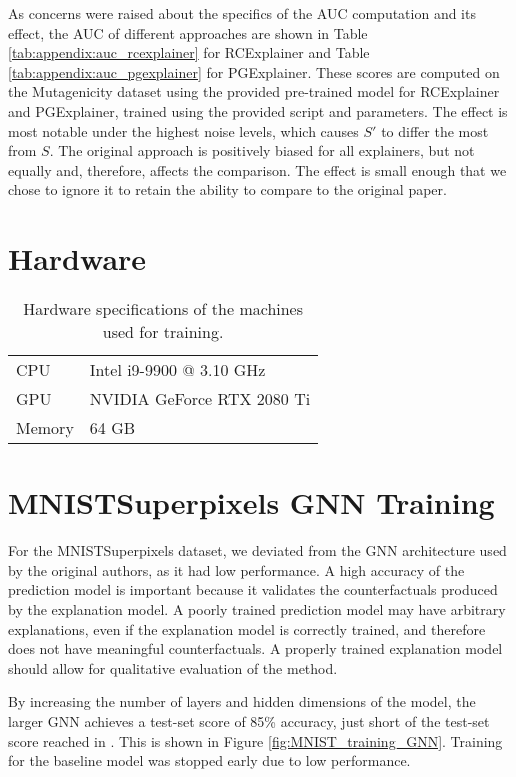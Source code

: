 As concerns were raised about the specifics of the AUC computation and its effect, the AUC of different approaches are shown in Table \ref{tab:appendix:auc_rcexplainer} for RCExplainer and Table \ref{tab:appendix:auc_pgexplainer} for PGExplainer. These scores are computed on the Mutagenicity dataset using the provided pre-trained model for RCExplainer and PGExplainer, trained using the provided script and parameters. The effect is most notable under the highest noise levels, which causes $S'$ to differ the most from $S$. The original approach is positively biased for all explainers, but not equally and, therefore, affects the comparison. The effect is small enough that we chose to ignore it to retain the ability to compare to the original paper. 


\section{Hardware}
\label{appendix:hardware}
\begin{table}[h]
\centering
\caption{Hardware specifications of the machines used for training.}
\label{tab:appendix:hwspec}
\begin{tabular}{ll}
\toprule 
CPU    & Intel i9-9900 @ 3.10 GHz      \\
GPU    & NVIDIA GeForce RTX 2080 Ti   \\
Memory & 64 GB                        \\
\bottomrule
\end{tabular}
\end{table}

\section{MNISTSuperpixels GNN Training}
\label{appendix:GNN_training}
For the MNISTSuperpixels dataset, we deviated from the GNN architecture used by the original authors, as it had low performance. A high accuracy of the prediction model is important because it validates the counterfactuals produced by the explanation model. A poorly trained prediction model may have arbitrary explanations, even if the explanation model is correctly trained, and therefore does not have meaningful counterfactuals. A properly trained explanation model should allow for qualitative evaluation of the method.

By increasing the number of layers and hidden dimensions of the model, the larger GNN achieves a test-set score of 85\% accuracy, just short of the test-set score reached in \cite{dwivedi2020benchmarking}. This is shown in  Figure \ref{fig:MNIST_training_GNN}. Training for the baseline model was stopped early due to low performance.


